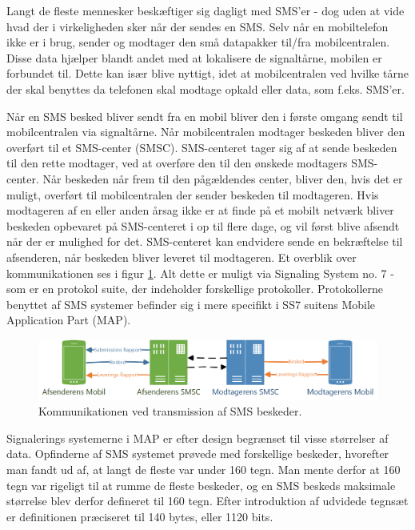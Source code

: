 Langt de fleste mennesker beskæftiger sig dagligt med SMS'er - dog uden at vide hvad der i virkeligheden sker når der sendes en SMS. Selv når en mobiltelefon ikke er i brug, sender og modtager den små datapakker til/fra mobilcentralen. Disse data hjælper blandt andet med at lokalisere de signaltårne, mobilen er forbundet til. Dette kan især blive nyttigt, idet at mobilcentralen ved hvilke tårne der skal benyttes da telefonen skal modtage opkald eller data, som f.eks. SMS'er.

Når en SMS besked bliver sendt fra en mobil bliver den i første omgang sendt til mobilcentralen via signaltårne. Når mobilcentralen modtager beskeden bliver den overført til et SMS-center (SMSC). SMS-centeret tager sig af at sende beskeden til den rette modtager, ved at overføre den til den ønskede modtagers SMS-center. Når beskeden når frem til den pågældendes center, bliver den, hvis det er muligt, overført til mobilcentralen der sender beskeden til modtageren. Hvis modtageren af en eller anden årsag ikke er at finde på et mobilt netværk bliver beskeden opbevaret på SMS-centeret i op til flere dage, og vil først blive afsendt når der er mulighed for det. SMS-centeret kan endvidere sende en bekræftelse til afsenderen, når beskeden bliver leveret til modtageren. Et overblik over kommunikationen ses i figur \ref{smsTransm}. Alt dette er muligt via Signaling System no. 7 - som er en protokol suite, der indeholder forskellige protokoller. Protokollerne benyttet af SMS systemer befinder sig i mere specifikt i SS7 suitens Mobile Application Part (MAP). \cite{Pro_1} \cite{sms_max1}

\noindent
\begin{figure}[hba]
\includegraphics[width=\linewidth]{Billeder/Mobil.png}
\caption {Kommunikationen ved transmission af SMS beskeder.}
\label{smsTransm}
\end{figure}

Signalerings systemerne i MAP er efter design begrænset til visse størrelser af data. Opfinderne af SMS systemet prøvede med forskellige beskeder, hvorefter man fandt ud af, at langt de fleste var under 160 tegn. Man mente derfor at 160 tegn var rigeligt til at rumme de fleste beskeder, og en SMS beskeds maksimale størrelse blev derfor defineret til 160 tegn. Efter introduktion af udvidede tegnsæt er definitionen præciseret til 140 bytes, eller 1120 bits. \cite{sms_max1} \cite{sms_max2}



